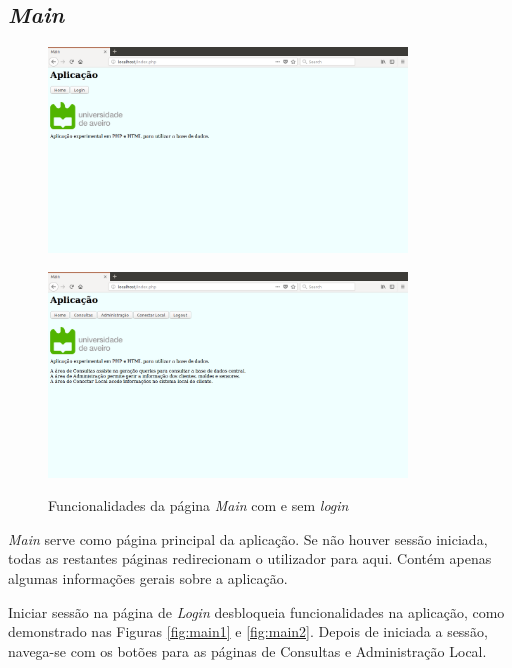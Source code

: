 \documentclass[11pt,twoside,a4paper]{report}
\begin{document}
\subsection{\textit{Main}}
\begin{figure}[H]
\centering
	\begin{minipage}{1.\textwidth}
		\begin{center}
			\includegraphics[width=0.85\textwidth]{main01} %
			\label{fig:main1}
		\end{center}
	\end{minipage}
	\begin{minipage}{1.\textwidth}
		\begin{center}
			\includegraphics[width=0.85\textwidth]{main02} %
			\label{fig:main2}
		\end{center}
	\end{minipage}
	\caption{Funcionalidades da página \textit{Main} com e sem \textit{login}}
	\label{fig:main0}
\end{figure}
\textit{Main} serve como página principal da aplicação. Se não houver sessão iniciada, todas as restantes páginas redirecionam o utilizador para aqui. Contém apenas algumas informações gerais sobre a aplicação.\par 
Iniciar sessão na página de \textit{Login} desbloqueia funcionalidades na aplicação, como demonstrado nas Figuras \ref{fig:main1} e \ref{fig:main2}. Depois de iniciada a sessão, navega-se com os botões para as páginas de Consultas e Administração Local.
\end{document}
